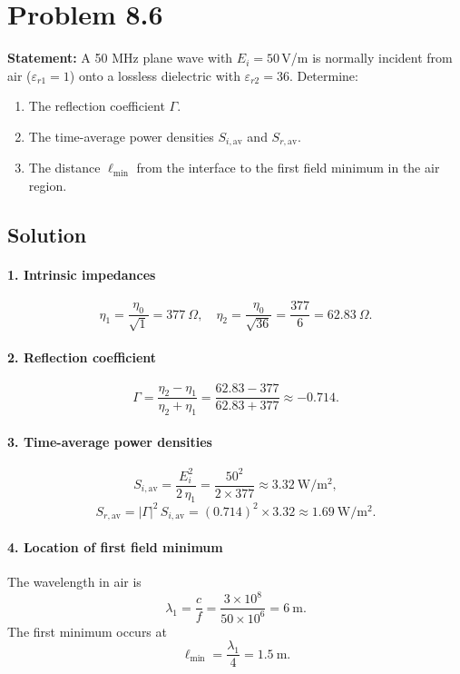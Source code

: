 
\section*{Problem 8.6}
\textbf{Statement:} A 50 MHz plane wave with $E_i = 50\,$V/m is normally incident from air ($\varepsilon_{r1}=1$) onto a lossless dielectric with $\varepsilon_{r2}=36$. Determine:
\begin{enumerate}
  \item The reflection coefficient $\Gamma$.
  \item The time-average power densities $S_{i,\mathrm{av}}$ and $S_{r,\mathrm{av}}$.
  \item The distance $\ell_{\min}$ from the interface to the first field minimum in the air region.
\end{enumerate}

\subsection*{Solution}

\paragraph{1. Intrinsic impedances}
\[
\eta_1 = \frac{\eta_0}{\sqrt{1}} = 377\ \Omega,
\quad
\eta_2 = \frac{\eta_0}{\sqrt{36}} = \frac{377}{6} = 62.83\ \Omega.
\]

\paragraph{2. Reflection coefficient}
\[
\Gamma
= \frac{\eta_2 - \eta_1}{\eta_2 + \eta_1}
= \frac{62.83 - 377}{62.83 + 377}
\approx -0.714.
\]

\paragraph{3. Time-average power densities}
\[
S_{i,\mathrm{av}}
= \frac{E_i^2}{2\,\eta_1}
= \frac{50^2}{2 \times 377}
\approx 3.32\ \mathrm{W/m^2},
\]
\[
S_{r,\mathrm{av}}
= |\Gamma|^2\,S_{i,\mathrm{av}}
= (0.714)^2 \times 3.32
\approx 1.69\ \mathrm{W/m^2}.
\]

\paragraph{4. Location of first field minimum}
The wavelength in air is
\[
\lambda_1 = \frac{c}{f}
= \frac{3\times10^8}{50\times10^6}
= 6\ \mathrm{m}.
\]
The first minimum occurs at
\[
\ell_{\min} = \frac{\lambda_1}{4} = 1.5\ \mathrm{m}.
\]

